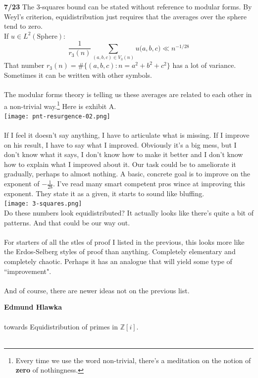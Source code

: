 \documentclass[12pt]{article}
\begin{document}
\newpage

\noindent \textbf{7/23} The 3-squares bound can be stated without reference to modular forms.  By Weyl's criterion, equidistribution just requires that the averages over the sphere tend to zero.  \\ If $u \in L^2 ( \text{Sphere})$:
$$  \frac{1}{r_3(n)} \sum_{(a,b,c) \in V_3(n)} u \big( a, b, c \big) \ll n^{-1/28} $$
That number $r_3(n) = \# \{ (a,b,c) : n = a^2 + b^2 + c^2 \}$ has a lot of variance. Sometimes it can be written with other symbols. \\ \\
The modular forms theory is telling us these averages are related to each other in a non-trivial way.\footnote{Every time we use the word non-trivial, there's a meditation on the notion of \textbf{zero} of nothingness.} Here is exhibit A. \\
\texttt{[image: pnt-resurgence-02.png]} \\ \\
If I feel it doesn't say anything, I have to articulate what is missing.  If I improve on his result, I have to say what I improved.  Obviously it's a big mess, but I don't know what it says, I don't know how to make it better and I don't know how to explain what I improved about it. Our task could be to ameliorate it gradually, perhaps to almost nothing.   A basic, concrete goal is to improve on the exponent of $- \frac{1}{28}$. I've read many smart competent pros wince at improving this exponent. They state it as a given, it starts to sound like bluffing.  \\
\texttt{[image: 3-squares.png]} \\
Do these numbers look equidistributed?  It actually looks like there's quite a bit of patterns.  And that could be our way out. \\ \\
For starters of all the stles of proof I listed in the previous, this looks more like the Erdos-Selberg styles of proof than anything.  Completely elementary and completely chaotic.  Perhaps it has an analogue that will yield some type of ``improvement". \\ \\
And of course, there are newer ideas not on the previous list.

\newpage 

\noindent \textbf{Edmund Hlawka}  \\ \\
towards Equidistribution of primes in $\mathbb{Z}[i]$. \\ \\
\end{document}

